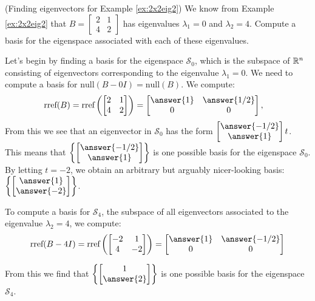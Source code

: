\documentclass{ximera}
\begin{document}
\begin{example}\label{ex:eigvectors2x2eig2} (Finding eigenvectors for Example \ref{ex:2x2eig2})
We know from Example \ref{ex:2x2eig2} that $B=\begin{bmatrix} 2& 1\\ 4&2
\end{bmatrix}$ has eigenvalues $\lambda_1=0$ and $\lambda_2=4$.  Compute a basis for the eigenspace associated with each of these eigenvalues.
\begin{explanation}
Let's begin by finding a basis for the eigenspace $\mathcal{S}_0$, which is the subspace of $\mathbb{R}^n$ consisting of eigenvectors corresponding to the eigenvalue $\lambda_1=0$.  We need to compute a basis for $\mbox{null}(B-0I) = \mbox{null}(B)$.  We compute:
\begin{align*}\mbox{rref}(B)=\mbox{rref}\left(\begin{bmatrix}2&1\\4&2\end{bmatrix}\right)&=\begin{bmatrix}\answer{1}&\answer{1/2}\\0&0\end{bmatrix},
\end{align*}
From this we see that an eigenvector in $\mathcal{S}_0$ has the form $\begin{bmatrix}\answer{-1/2}\\\answer{1}\end{bmatrix}t$.
This means that $\left\{\begin{bmatrix}\answer{-1/2}\\\answer{1}\end{bmatrix}\right\}$
     is one possible basis for the eigenspace $\mathcal{S}_0$.  By letting $t=-2$, we obtain an arbitrary but arguably nicer-looking basis: $\left\{\begin{bmatrix}\answer{1}\\\answer{-2}\end{bmatrix}\right\}$.

    
To compute a basis for $\mathcal{S}_4$, the subspace of all eigenvectors associated to the eigenvalue $\lambda_2=4$, we compute:
$$\mbox{rref}(B-4I)=\mbox{rref}\left(\begin{bmatrix}-2&1\\4&-2\end{bmatrix}\right)=\begin{bmatrix}\answer{1}&\answer{-1/2}\\0&0\end{bmatrix}$$

    
From this we find that $\left\{\begin{bmatrix}1\\\answer{2}\end{bmatrix}\right\}$ is one possible basis for the eigenspace $\mathcal{S}_4$.
\end{explanation}
\end{example}
    
\end{document}
